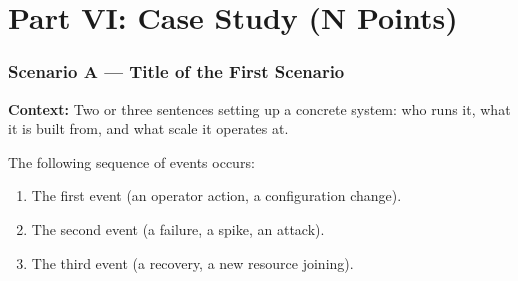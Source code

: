 %
%

\section*{Part VI: Case Study \hfill \normalfont\normalsize(N Points)}

\begin{center}
\end{center}

\vspace{8mm}

\subsubsection*{Scenario A --- Title of the First Scenario}

\textbf{Context:}
Two or three sentences setting up a concrete system: who runs it,
what it is built from, and what scale it operates at.

The following sequence of events occurs:
\begin{enumerate}
\item The first event (an operator action, a configuration change).
\item The second event (a failure, a spike, an attack).
\item The third event (a recovery, a new resource joining).
\end{enumerate}

